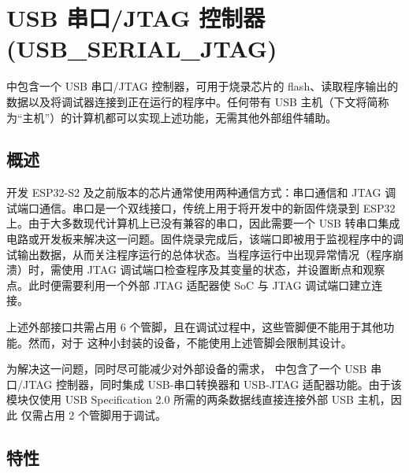 \documentclass[main\_\_CN.tex]{subfiles}
\begin{document}

\ifglobal
\else
    {\let\clearpage\relax \listoftodos}
    \tableofcontents
\fi




\chapter{USB 串口/JTAG 控制器 (USB\_SERIAL\_JTAG)}
\label{mod:usbserialjtag}
\hypertarget{usbserialjtag}{}


\chipname{} 中包含一个 USB 串口/JTAG 控制器，可用于烧录芯片的 flash、读取程序输出的数据以及将调试器连接到正在运行的程序中。任何带有 USB 主机（下文将简称为“主机”）的计算机都可以实现上述功能，无需其他外部组件辅助。

\section{概述}

开发 ESP32-S2 及之前版本的芯片通常使用两种通信方式：串口通信和 JTAG 调试端口通信。串口是一个双线接口，传统上用于将开发中的新固件烧录到 ESP32 上。由于大多数现代计算机上已没有兼容的串口，因此需要一个 USB 转串口集成电路或开发板来解决这一问题。固件烧录完成后，该端口即被用于监视程序中的调试输出数据，从而关注程序运行的总体状态。当程序运行中出现异常情况（程序崩溃）时，需使用 JTAG 调试端口检查程序及其变量的状态，并设置断点和观察点。此时便需要利用一个外部 JTAG 适配器使 SoC 与 JTAG 调试端口建立连接。

上述外部接口共需占用 6 个管脚，且在调试过程中，这些管脚便不能用于其他功能。然而，对于 \chipname{} 这种小封装的设备，不能使用上述管脚会限制其设计。

为解决这一问题，同时尽可能减少对外部设备的需求，\chipname{} 中包含了一个 USB 串口/JTAG 控制器，同时集成 USB-串口转换器和 USB-JTAG 适配器功能。由于该模块仅使用 USB Specification 2.0 所需的两条数据线直接连接外部 USB 主机，因此 \chipname{} 仅需占用 2 个管脚用于调试。


\section{特性}
\label{sec:usbserialjtag-features}
\end{document}

